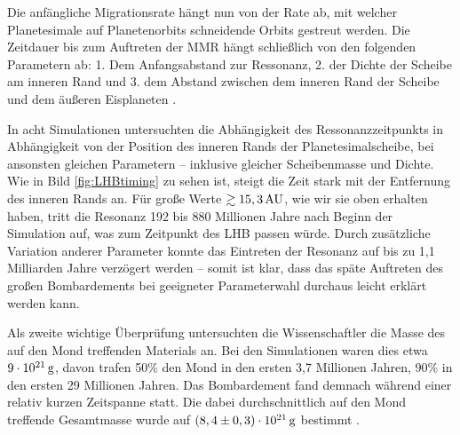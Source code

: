 \documentclass[12pt,a4paper,twoside,open=right,bibliography=totoc]{scrbook}
\renewcommand{\cite}{ \citep}
\begin{document}
Die anfängliche Migrationsrate hängt nun von der Rate ab, mit welcher Planetesimale auf Planetenorbits schneidende Orbits gestreut werden. Die Zeitdauer bis zum Auftreten der MMR hängt schließlich von den folgenden Parametern ab:
1. Dem Anfangsabstand zur Ressonanz, 2. der Dichte der Scheibe am inneren Rand und 3. dem Abstand zwischen dem inneren Rand der Scheibe und dem äußeren Eisplaneten\cite{Gomes2005}.

In acht Simulationen untersuchten \cite{Gomes2005} die Abhängigkeit des Ressonanzzeitpunkts in Abhängigkeit von der Position des inneren Rands der Planetesimalscheibe, bei ansonsten gleichen Parametern – inklusive gleicher Scheibenmasse und Dichte. Wie in Bild \ref{fig:LHBtiming} zu sehen ist, steigt die Zeit stark mit der Entfernung des inneren Rands an. Für große Werte $\gtrsim \unit[15,3]{AU}$, wie wir sie oben erhalten haben, tritt die Resonanz 192 bis 880 Millionen Jahre nach Beginn der Simulation auf, was zum Zeitpunkt des LHB passen würde. %
Durch zusätzliche Variation anderer Parameter konnte das Eintreten der Resonanz auf bis zu 1,1 Milliarden Jahre\cite{Gomes2005} verzögert werden – somit ist klar, dass das späte Auftreten des großen Bombardements bei geeigneter Parameterwahl durchaus leicht erklärt werden kann.

Als zweite wichtige Überprüfung untersuchten die Wissenschaftler die Masse des auf den Mond treffenden Materials an. Bei den Simulationen waren dies etwa $\unit[9 \cdot 10^{21}]{g}$, davon trafen 50\% den Mond in den ersten 3,7 Millionen Jahren, 90\% in den ersten 29 Millionen Jahren. Das Bombardement fand demnach während einer relativ kurzen Zeitspanne statt. Die dabei durchschnittlich auf den Mond treffende Gesamtmasse wurde auf $\unit[\left(8,4 \pm 0,3\right) \cdot 10^{21}]{g}$ bestimmt\cite{Gomes2005}.
\end{document}
